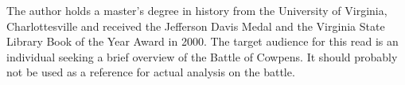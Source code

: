 The author holds a master’s degree in history from the University of Virginia,
Charlottesville and received the Jefferson Davis Medal and the Virginia State
Library Book of the Year Award in 2000. The target audience for this read is
an individual seeking a brief overview of the Battle of Cowpens. It should
probably not be used as a reference for actual analysis on the battle. 
